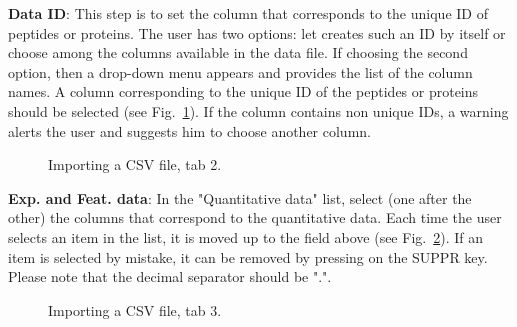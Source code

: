 \documentclass[12pt]{article}
\begin{document}
{\textbf {Data ID}: This step is to set the column that corresponds to the 
unique ID of peptides or proteins. The user has two options: let  
creates such an ID by itself or choose among the columns available in the 
data file. If choosing the second option, then a drop-down menu appears and 
provides the list of the column names. A column corresponding to the unique 
ID of the peptides or proteins should be selected (see Fig.~\ref{fig:imp2}). 
If the column contains non unique IDs, a warning alerts the user and suggests 
him to choose another column.}
\begin {figure}
\centering
{}
\caption{Importing a CSV file, tab 2.}\label{fig:imp2}
\end {figure}

\textbf {Exp. and Feat. data}: In the "Quantitative data" list, select (one 
after the other) the columns that correspond to the quantitative data. 
Each time the user selects an item in the list, it is moved up to the field 
above (see Fig.~\ref{fig:imp3}). If an item is selected by mistake, it can be 
removed by pressing on the SUPPR key.
\newline Please note that the decimal separator should be ".". 
\begin {figure}
\centering
{}
\caption{Importing a CSV file, tab 3.}\label{fig:imp3}
\end {figure}
\end{document}
